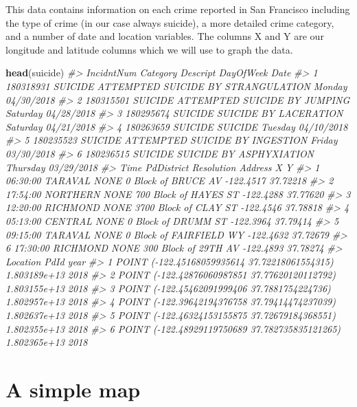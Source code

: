 \documentclass[
  12pt,
]{book}
\newenvironment{Shaded}{\begin{snugshade}}{\end{snugshade}}
\newcommand{\CommentTok}[1]{\textcolor[rgb]{0.56,0.35,0.01}{\textit{#1}}}
\newcommand{\KeywordTok}[1]{\textcolor[rgb]{0.13,0.29,0.53}{\textbf{#1}}}
\newcommand{\NormalTok}[1]{#1}
\begin{document}
This data contains information on each crime reported in San Francisco including the type of crime (in our case always suicide), a more detailed crime category, and a number of date and location variables. The columns X and Y are our longitude and latitude columns which we will use to graph the data.

\begin{Shaded}
\begin{Highlighting}[]
\KeywordTok{head}\NormalTok{(suicide)}
\CommentTok{\#>   IncidntNum Category                           Descript DayOfWeek       Date}
\CommentTok{\#> 1  180318931  SUICIDE ATTEMPTED SUICIDE BY STRANGULATION    Monday 04/30/2018}
\CommentTok{\#> 2  180315501  SUICIDE       ATTEMPTED SUICIDE BY JUMPING  Saturday 04/28/2018}
\CommentTok{\#> 3  180295674  SUICIDE              SUICIDE BY LACERATION  Saturday 04/21/2018}
\CommentTok{\#> 4  180263659  SUICIDE                            SUICIDE   Tuesday 04/10/2018}
\CommentTok{\#> 5  180235523  SUICIDE     ATTEMPTED SUICIDE BY INGESTION    Friday 03/30/2018}
\CommentTok{\#> 6  180236515  SUICIDE            SUICIDE BY ASPHYXIATION  Thursday 03/29/2018}
\CommentTok{\#>       Time PdDistrict Resolution                 Address         X        Y}
\CommentTok{\#> 1 06:30:00    TARAVAL       NONE     0 Block of BRUCE AV {-}122.4517 37.72218}
\CommentTok{\#> 2 17:54:00   NORTHERN       NONE   700 Block of HAYES ST {-}122.4288 37.77620}
\CommentTok{\#> 3 12:20:00   RICHMOND       NONE   3700 Block of CLAY ST {-}122.4546 37.78818}
\CommentTok{\#> 4 05:13:00    CENTRAL       NONE     0 Block of DRUMM ST {-}122.3964 37.79414}
\CommentTok{\#> 5 09:15:00    TARAVAL       NONE 0 Block of FAIRFIELD WY {-}122.4632 37.72679}
\CommentTok{\#> 6 17:30:00   RICHMOND       NONE    300 Block of 29TH AV {-}122.4893 37.78274}
\CommentTok{\#>                                         Location         PdId year}
\CommentTok{\#> 1  POINT ({-}122.45168059935614 37.72218061554315) 1.803189e+13 2018}
\CommentTok{\#> 2  POINT ({-}122.42876060987851 37.77620120112792) 1.803155e+13 2018}
\CommentTok{\#> 3   POINT ({-}122.45462091999406 37.7881754224736) 1.802957e+13 2018}
\CommentTok{\#> 4  POINT ({-}122.39642194376758 37.79414474237039) 1.802637e+13 2018}
\CommentTok{\#> 5  POINT ({-}122.46324153155875 37.72679184368551) 1.802355e+13 2018}
\CommentTok{\#> 6 POINT ({-}122.48929119750689 37.782735835121265) 1.802365e+13 2018}
\end{Highlighting}
\end{Shaded}

\hypertarget{a-simple-map}{%
\section{A simple map}\label{a-simple-map}}
\end{document}
